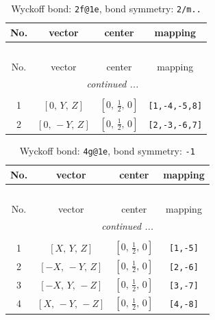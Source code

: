 \documentclass[fleqn,8pt]{jsarticle}
\begin{document}
\begin{longtable}{cccc}
\caption{Wyckoff bond: {\tt 2f@1e}, bond symmetry: {\tt 2/m..}}
 \\
 \hline \hline
No. & vector & center & mapping \\ \hline \endfirsthead

\multicolumn{3}{l}{\tablename\ \thetable{}} \\
 \hline \hline
No. & vector & center & mapping \\ \hline \endhead

 \hline \hline
\multicolumn{3}{r}{\footnotesize\it continued ...} \\ \endfoot

 \hline \hline
\multicolumn{3}{r}{} \\ \endlastfoot

1 & $\left[ 0,\, Y,\, Z \right]$ & $\left[ 0,\, \frac{1}{2},\, 0 \right]$ & {\tt [1,-4,-5,8]} \\ \hline
2 & $\left[ 0,\, - Y,\, Z \right]$ & $\left[ 0,\, \frac{1}{2},\, 0 \right]$ & {\tt [2,-3,-6,7]} \\
\end{longtable}
\renewcommand{\arraystretch}{1.2}
\begin{longtable}{cccc}
\caption{Wyckoff bond: {\tt 4g@1e}, bond symmetry: {\tt -1}}
 \\
 \hline \hline
No. & vector & center & mapping \\ \hline \endfirsthead

\multicolumn{3}{l}{\tablename\ \thetable{}} \\
 \hline \hline
No. & vector & center & mapping \\ \hline \endhead

 \hline \hline
\multicolumn{3}{r}{\footnotesize\it continued ...} \\ \endfoot

 \hline \hline
\multicolumn{3}{r}{} \\ \endlastfoot

1 & $\left[ X,\, Y,\, Z \right]$ & $\left[ 0,\, \frac{1}{2},\, 0 \right]$ & {\tt [1,-5]} \\ \hline
2 & $\left[ - X,\, - Y,\, Z \right]$ & $\left[ 0,\, \frac{1}{2},\, 0 \right]$ & {\tt [2,-6]} \\ \hline
3 & $\left[ - X,\, Y,\, - Z \right]$ & $\left[ 0,\, \frac{1}{2},\, 0 \right]$ & {\tt [3,-7]} \\ \hline
4 & $\left[ X,\, - Y,\, - Z \right]$ & $\left[ 0,\, \frac{1}{2},\, 0 \right]$ & {\tt [4,-8]} \\
\end{longtable}
\end{document}
